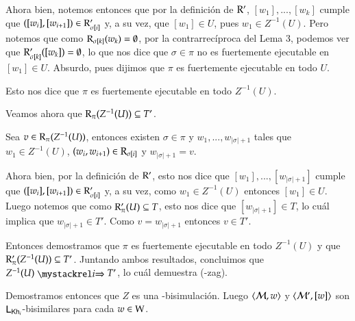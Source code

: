 \begin{demostracion}
\begin{itemize}
        Ahora bien, notemos entonces que por la definición de $\mathrm{R}'$, $[w_1],...,[w_k]$ cumple que $([w_i],[w_{i+1}]) \in \mathrm{R}'_{\sigma[i]}$ y, a su vez, que $[w_1] \in U$, pues $w_1 \in Z^{-1}(U)$. Pero notemos que como $\mathrm{R}_{\sigma[k]}(w_k) = \emptyset$, por la contrarrecíproca del Lema 3, podemos ver que $\mathrm{R}'_{\sigma[k]}([w_k]) = \emptyset$, lo que nos dice que $\sigma \in \pi$ no es fuertemente ejecutable en $[w_1] \in U$. Absurdo, pues dijimos que $\pi$ es fuertemente ejecutable en todo $U$.

        Esto nos dice que $\pi$ es fuertemente ejecutable en todo $Z^{-1}(U)$.

        Veamos ahora que $\mathrm{R}_\pi(Z^{-1}(U)) \subseteq T'$.

        Sea $v \in \mathrm{R}_\pi(Z^{-1}(U))$, entonces existen $\sigma \in \pi$ y $w_1,...,w_{|\sigma|+1}$ tales que $w_1 \in Z^{-1}(U)$, $(w_i,w_{i+1}) \in \mathrm{R}_{\sigma[i]}$ y $w_{|\sigma|+1} = v$. 

        Ahora bien, por la definición de $\mathrm{R}'$, esto nos dice que $[w_1],...,[w_{|\sigma|+1}]$ cumple que $([w_i],[w_{i+1}]) \in \mathrm{R}'_{\sigma[i]}$ y, a su vez, como $w_1 \in Z^{-1}(U)$ entonces $[w_1] \in U$. Luego notemos que como $\mathrm{R}'_\pi(U) \subseteq T$, esto nos dice que $[w_{|\sigma|+1}] \in T$, lo cuál implica que $w_{|\sigma|+1} \in T'$. Como $v = w_{|\sigma|+1}$ entonces $v \in T'$. 

        Entonces demostramos que $\pi$ es fuertemente ejecutable en todo $Z^{-1}(U)$ y que $\mathrm{R}'_\pi(Z^{-1}(U)) \subseteq T'$. Juntando ambos resultados, concluimos que $Z^{-1}(U) \ultsExecAgi T'$, lo cuál demuestra (\KHilogic-zag).
    \end{itemize}

    Demostramos entonces que $Z$ es una \KHilogic-bisimulación. Luego $\langle \mathcal{M},w \rangle$ y $\langle \mathcal{M}',[w] \rangle$ son $\mathsf{L}_{\mathsf{Kh}_i}$-bisimilares para cada $w \in \mathrm{W}$.
    
\end{demostracion}
